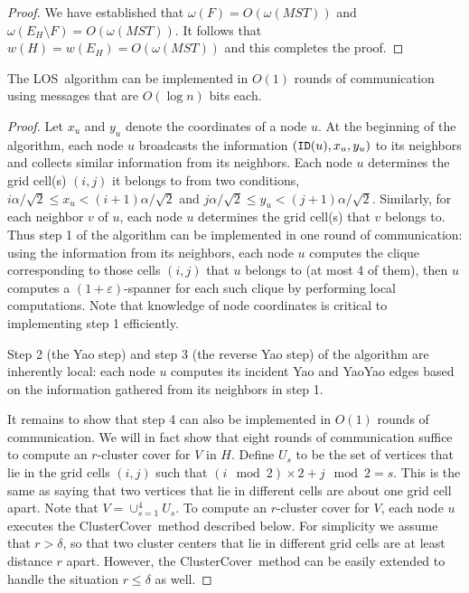 \documentclass{llncs}
\newcommand{\ABox}{
\raisebox{3pt}{\framebox[6pt]{\rule{6pt}{0pt}}}
}
\newcommand{\e}{\varepsilon}
\newcommand{\id}{{\tt ID}}
\newcommand{\alg}{{\sc LOS}}
\newcommand{\cc}{{\sc ClusterCover}}
\newcommand{\w}{\omega}
\begin{document}
\begin{proof}
We have established that $\w(F) = O(\w(MST))$ and $\w(E_H\setminus F)=O(\w(MST))$.
It follows that $w(H) = w(E_H) = O(\w(MST))$ and this completes the proof.
\hfill\ABox
\end{proof}

\begin{theorem}
The \alg\ algorithm can be implemented in $O(1)$ rounds of communication using messages that
are $O(\log n)$ bits each.
\label{thm:communication}
\end{theorem}
\begin{proof}
Let $x_u$ and $y_u$ denote the coordinates of a node $u$. At the beginning of
the algorithm, each node $u$ broadcasts the information $(\id(u), x_u, y_u)$
to its neighbors and collects similar information from its neighbors.
Each node $u$ determines the grid cell(s) $(i,j)$ it belongs to from
two conditions, $i\alpha/\sqrt{2} \le  x_u < (i+1)\alpha/\sqrt{2}$
and
$j\alpha/\sqrt{2} \le  y_u < (j+1)\alpha/\sqrt{2}$.
Similarly, for each neighbor $v$ of $u$, each node $u$ determines the grid
cell(s) that $v$ belongs to. Thus step 1 of the algorithm can be implemented
in one round of communication: using the information from its neighbors,
each node $u$ computes the clique corresponding to those cells $(i,j)$ that
$u$ belongs to (at most 4 of them), then $u$ computes a $(1+\e)$-spanner for each
such clique by performing local computations.
Note that knowledge of node coordinates is critical to implementing step 1
efficiently.

Step 2 (the Yao step) and step 3 (the reverse Yao step) of the algorithm
are inherently local: each node $u$ computes its incident Yao and YaoYao
edges based on the information gathered from its neighbors in step 1.

It remains to show that step 4 can also be implemented in $O(1)$ rounds
of communication. We will in fact show that eight rounds of communication
suffice to compute an $r$-cluster cover for $V$ in $H$.
Define $U_s$ to be the set of vertices that lie in the grid cells $(i,j)$ such
that $(i \mod 2)\times 2+ j \mod 2 = s$. This is the same as saying that
two vertices that lie in different cells are about one grid cell apart.
Note that $V = \cup_{s=1}^4 U_s$. To compute an $r$-cluster cover for $V$,
each node $u$ executes the \cc\ method described below. For
simplicity we assume that $r > \delta$, so that two cluster centers that lie in different
grid cells are at least distance $r$ apart. However, the \cc\ method
can be easily extended to handle the situation $r \le \delta$ as well.


\end{proof}
\end{document}
